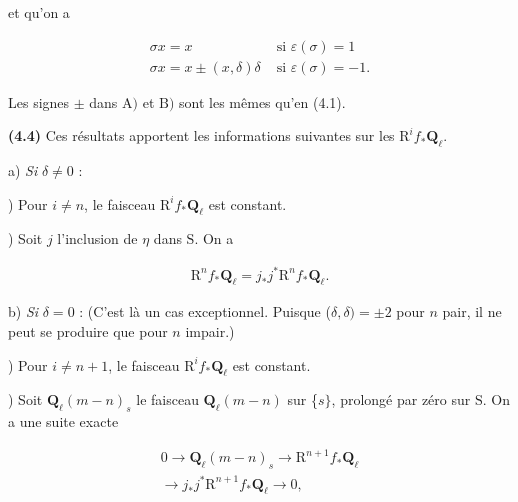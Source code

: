 \documentclass[10pt,leqno]{article}
\begin{document}
\noindent et qu’on a\par

\[\begin{array}{ll}\sigma x = x&\text{ si }\varepsilon (\sigma )=1\\\sigma x = x \pm  (x,\delta )\delta &\text{ si }\varepsilon (\sigma )=- 1.\end{array}\]

\noindent Les signes \(\pm \) dans \(\mathrm{A})\) et \(\mathrm{B})\) sont les mêmes qu’en (4.1).\par

\noindent \textbf{(4.4)} Ces résultats apportent les informations suivantes sur les \(\mathrm{R}^{i} f_{*}\mathbf{Q}_{\ell }\).\par

\noindent a) \emph{Si} \(\delta \ne 0\) :\par

) Pour \(i\ne n\), le faisceau \(\mathrm{R}^{i} f_{*}\mathbf{Q}_{\ell }\) est constant.\par

) Soit \(j\) l’inclusion de \(\eta \) dans \(\mathrm{S}\). On a\par

\begin{equation*}\begin{gathered}\mathrm{R}^{n} f_{*}\mathbf{Q}_{\ell } = j_{*}j^{*}\mathrm{R}^{n} f_{*}\mathbf{Q}_{\ell }.\end{gathered}\end{equation*}

\noindent b) \emph{Si} \(\delta =0\) : (C’est là un cas exceptionnel. Puisque (\(\delta ,\delta )=\pm 2\) pour \(n\) pair, il ne peut se produire que pour \(n\) impair.)\par

) Pour \(i\ne n+1\), le faisceau \(\mathrm{R}^{i} f_{*}\mathbf{Q}_{\ell }\) est constant.\par

) Soit \(\mathbf{Q}_{\ell }(m- n)_{s}\) le faisceau \(\mathbf{Q}_{\ell }(m- n)\) sur \{\(s\}\), prolongé par zéro sur \(\mathrm{S}\). On a une suite exacte\par

\begin{equation*}\begin{gathered}0 \longrightarrow  \mathbf{Q}_{\ell }(m- n)_{s} \longrightarrow  \mathrm{R}^{n+1}f_{*}\mathbf{Q}_{\ell } \\ \longrightarrow  j_{*}j^{*}\mathrm{R}^{n+1}f_{*}\mathbf{Q}_{\ell } \longrightarrow  0,\end{gathered}\end{equation*}
\end{document}
